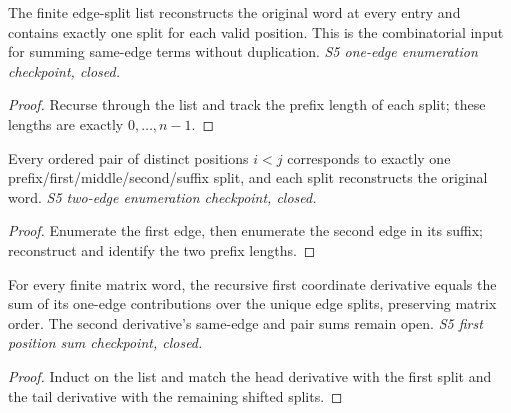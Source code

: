 \begin{lemma}
  \label{lem:loop-edge-splits}
  \leanok
  The finite edge-split list reconstructs the original word at every entry
  and contains exactly one split for each valid position. This is the
  combinatorial input for summing same-edge terms without duplication.
  \emph{S5 one-edge enumeration checkpoint, closed.}
\end{lemma}
\begin{proof}\leanok
  Recurse through the list and track the prefix length of each split;
  these lengths are exactly $0,\ldots,n-1$.
\end{proof}

\begin{lemma}
  \label{lem:loop-pair-splits}
  \leanok
  Every ordered pair of distinct positions $i<j$ corresponds to exactly one
  prefix/first/middle/second/suffix split, and each split reconstructs the
  original word. \emph{S5 two-edge enumeration checkpoint, closed.}
\end{lemma}
\begin{proof}\leanok
  Enumerate the first edge, then enumerate the second edge in its suffix;
  reconstruct and identify the two prefix lengths.
\end{proof}

\begin{lemma}
  \label{lem:loop-first-position-sum}
  \leanok
  For every finite matrix word, the recursive first coordinate derivative
  equals the sum of its one-edge contributions over the unique edge splits,
  preserving matrix order. The second derivative's same-edge and pair sums
  remain open. \emph{S5 first position sum checkpoint, closed.}
\end{lemma}
\begin{proof}\leanok
  Induct on the list and match the head derivative with the first split and
  the tail derivative with the remaining shifted splits.
\end{proof}

